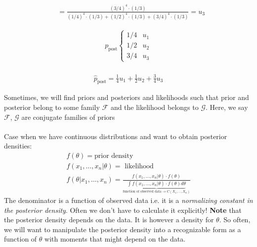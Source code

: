 \begin{example-N}
\begin{align*}
		& = \frac{(3/4)^4 \cdot (1/3)}{(1/4)^4 \cdot (1/3) + (1/2)^4 \cdot (1/3) + (3/4)^4 \cdot (1/3)} = u_3
	\end{align*}
	\begin{multicols}{2}
	\begin{gather*}
		p_{\text{post}} \begin{cases}
			1/4 & u_1\\
			1/2 & u_2\\
			3/4 & u_3
		\end{cases}
	\end{gather*}\\
	\begin{gather*}
		\hat{p}_{\text{post}} = \frac{1}{4}u_1 + \frac{1}{2}u_2 + \frac{3}{4}u_3
	\end{gather*}	
	\end{multicols}
\end{example-N}
Sometimes, we will find priors and posteriors and likelihoods such that prior and posterior belong to some family $\mathcal{F}$ and the likelihood belongs to $\mathcal{G}$. Here, we say $\mathcal{F}$, $\mathcal{G}$ are conjugate families of priors\\\\
Case when we have continuous distributions and want to obtain posterior densities:
\begin{gather*}
	f(\theta) = \text{prior density}\\
	f(x_1, \ldots, x_n| \theta) = \text{ likelihood}\\
	f(\theta | x_1, \ldots, x_n) = \frac{f(x_1, \ldots, x_n| \theta) \cdot f(\theta)}{\underbrace{\boxed{\int f(x_1, \ldots, x_n| \theta) \cdot f(\theta) d\theta}}_{\text{function of observed data} \rightarrow C(X_1, \ldots, X_n)}}
\end{gather*}
The denominator is a function of observed data i.e. it is a \emph{normalizing constant in the posterior density}. Often we don't have to calculate it explicitly! \textbf{Note} that the posterior density depends on the data. It is however a density for $\theta$. So often, we will want to manipulate the posterior density into a recognizable form as a function of $\theta$ with moments that might depend on the data. 